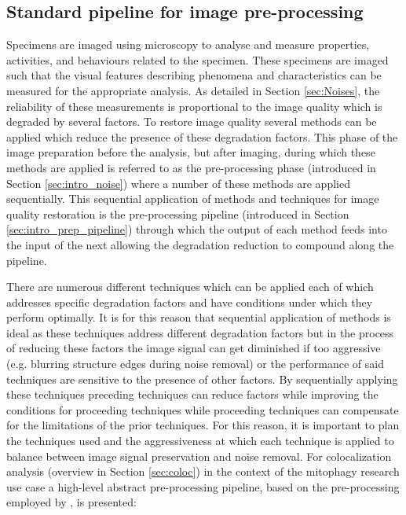 \subsection{Standard pipeline for image pre-processing}\label{subsec:pipe}
Specimens are imaged using microscopy to analyse and measure properties, activities, and behaviours related to the specimen. These specimens are imaged such that the visual features describing phenomena and characteristics can be measured for the appropriate analysis. As detailed in Section \ref{sec:Noises}, the reliability of these measurements is proportional to the image quality which is degraded by several factors. To restore image quality several methods can be applied which reduce the presence of these degradation factors. This phase of the image preparation before the analysis, but after imaging, during which these methods are applied is referred to as the pre-processing phase (introduced in Section \ref{sec:intro_noise}) where a number of these methods are applied sequentially. This sequential application of methods and techniques for image quality restoration is the pre-processing pipeline (introduced in Section \ref{sec:intro_prep_pipeline}) through which the output of each method feeds into the input of the next allowing the degradation reduction to compound along the pipeline. \par There are numerous different techniques which can be applied each of which addresses specific degradation factors and have conditions under which they perform optimally. It is for this reason that sequential application of methods is ideal as these techniques address different degradation factors but in the process of reducing these factors the image signal can get diminished if too aggressive (e.g. blurring structure edges during noise removal) or the performance of said techniques are sensitive to the presence of other factors. By sequentially applying these techniques preceding techniques can reduce factors while improving the conditions for proceeding techniques while proceeding techniques can compensate for the limitations of the prior techniques. For this reason, it is important to plan the techniques used and the aggressiveness at which each technique is applied to balance between image signal preservation and noise removal. For colocalization analysis (overview in Section \ref{sec:coloc}) in the context of the mitophagy research use case a high-level abstract pre-processing pipeline, based on the pre-processing employed by \cite{PipelineDecon-Chaudhry}, is presented: 
